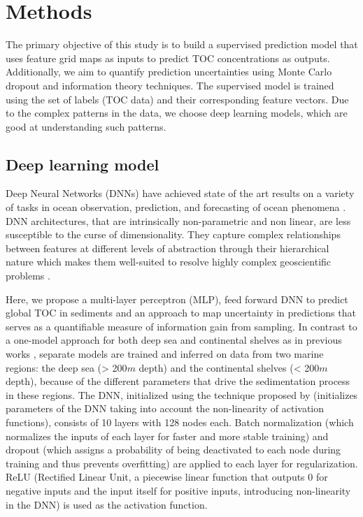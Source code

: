\documentclass[journal abbreviation, manuscript]{copernicus}
\begin{document}
\section{Methods}
\label{sec:methods}

The primary objective of this study is to build a supervised prediction model that uses feature grid maps as inputs to predict TOC concentrations as outputs. Additionally, we aim to quantify prediction uncertainties using Monte Carlo dropout and information theory techniques. The supervised model is trained using the set of labels (TOC data) and their corresponding feature vectors. Due to the complex patterns in the data, we choose deep learning models, which are good at understanding such patterns.


\subsection{Deep learning model}
Deep Neural Networks (DNNs) have achieved state of the art results on a variety of tasks in ocean observation, prediction, and forecasting of ocean phenomena \citep{reviewAIinMarineScience}. DNN architectures, that are intrinsically non-parametric and non linear, are less susceptible to the curse of dimensionality. They capture complex relationships between features at different levels of abstraction through their hierarchical nature which makes them well-suited to resolve highly complex geoscientific problems \citep{LeCun2015}. 

Here, we propose a multi-layer perceptron (MLP), feed forward DNN to predict global TOC in sediments and an approach to map uncertainty in predictions that serves as a quantifiable measure of information gain from sampling. In contrast to a one-model approach for both deep sea and continental shelves as in previous works \citep{Restreppo2020, restrepo2, Martin2005Porosity, LeeTOCkNN}, separate models are trained and inferred on data from two marine regions: the deep sea (> 200$m$ depth) and the continental shelves (< 200$m$ depth), because of the different parameters that drive the sedimentation process in these regions. The DNN, initialized using the technique proposed by \cite{he2015delving} (initializes parameters of the DNN taking into account the non-linearity of activation functions), consists of 10 layers with 128 nodes each. Batch normalization (which normalizes the inputs of each layer for faster and more stable training) and dropout (which assigns a probability of being deactivated to each node during training and thus prevents overfitting) are applied to each layer for regularization. ReLU (Rectified Linear Unit, a piecewise linear function that outputs 0 for negative inputs and the input itself for positive inputs, introducing non-linearity in the DNN) is used as the activation function.
\end{document}
